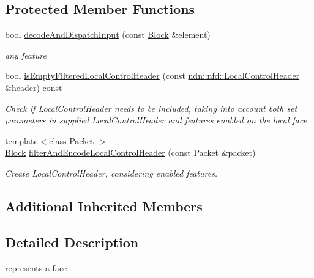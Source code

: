 \subsection*{Protected Member Functions}
\begin{DoxyCompactItemize}
\item 
bool \hyperlink{classnfd_1_1LocalFace_acc0605a77317fd364ac2e1d05a1535b0}{decode\+And\+Dispatch\+Input} (const \hyperlink{classndn_1_1Block}{Block} \&element)
\begin{DoxyCompactList}\small\item\em any feature \end{DoxyCompactList}\item 
bool \hyperlink{classnfd_1_1LocalFace_a3dc805b08532da25ff4fab0ad8086717}{is\+Empty\+Filtered\+Local\+Control\+Header} (const \hyperlink{classndn_1_1nfd_1_1LocalControlHeader}{ndn\+::nfd\+::\+Local\+Control\+Header} \&header) const\hypertarget{classnfd_1_1LocalFace_a3dc805b08532da25ff4fab0ad8086717}{}\label{classnfd_1_1LocalFace_a3dc805b08532da25ff4fab0ad8086717}

\begin{DoxyCompactList}\small\item\em Check if Local\+Control\+Header needs to be included, taking into account both set parameters in supplied Local\+Control\+Header and features enabled on the local face. \end{DoxyCompactList}\item 
{\footnotesize template$<$class Packet $>$ }\\\hyperlink{classndn_1_1Block}{Block} \hyperlink{classnfd_1_1LocalFace_a1fe034794feda41c98dace31f4bf883f}{filter\+And\+Encode\+Local\+Control\+Header} (const Packet \&packet)\hypertarget{classnfd_1_1LocalFace_a1fe034794feda41c98dace31f4bf883f}{}\label{classnfd_1_1LocalFace_a1fe034794feda41c98dace31f4bf883f}

\begin{DoxyCompactList}\small\item\em Create Local\+Control\+Header, considering enabled features. \end{DoxyCompactList}\end{DoxyCompactItemize}
\subsection*{Additional Inherited Members}


\subsection{Detailed Description}
represents a face 

